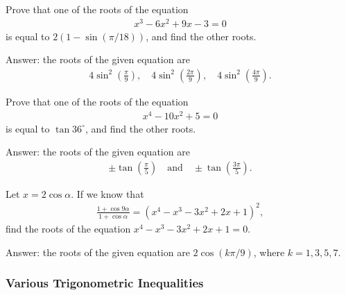 \begin{question}
    Prove that one of the roots of the equation
    \begin{align*}
        x^3-6x^2+9x-3=0
    \end{align*}
    is equal to $2(1-\sin(\pi/18))$, and find the other roots.
\end{question}

\begin{solution}
    Answer: the roots of the given equation are
    \begin{align*}
        4\sin^2\left(\frac{\pi}{9}\right), \quad 4\sin^2\left(\frac{2\pi}{9}\right), \quad 4\sin^2\left(\frac{4\pi}{9}\right).
    \end{align*}
\end{solution}



\begin{question}
    Prove that one of the roots of the equation
    \begin{align*}
        x^4 - 10x^2 + 5 =0
    \end{align*}
    is equal to $\tan 36^\circ$, and find the other roots.
\end{question}

\begin{solution}
    Answer: the roots of the given equation are
    \begin{align*}
        \pm \tan\left(\frac{\pi}{5}\right) \quad \text{and} \quad \pm \tan\left(\frac{3\pi}{5}\right).
    \end{align*}
\end{solution}

\begin{question}
    Let $x=2\cos \alpha$. If we know that
    \begin{align*}
        \frac{1+\cos 9\alpha}{1+\cos \alpha} = (x^4-x^3-3x^2+2x+1)^2,
    \end{align*}
    find the roots of the equation $x^4-x^3-3x^2+2x+1=0$.
\end{question}

\begin{solution}
    Answer: the roots of the given equation are $2\cos(k\pi/9)$, where $k=1,3,5,7$.
\end{solution}

\subsubsection{Various Trigonometric Inequalities}


